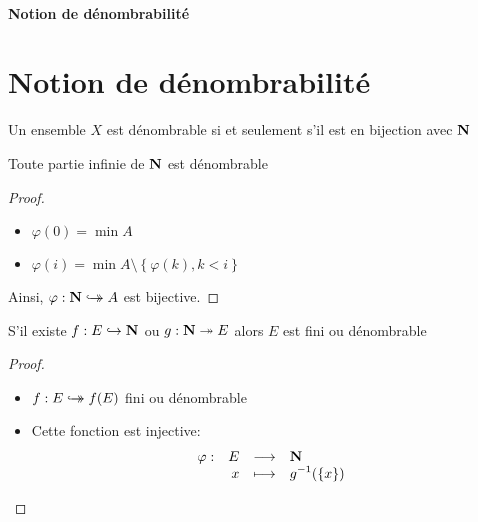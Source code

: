 \ifsolo
    ~

    \vspace{1cm}

    \begin{center}
        \textbf{\LARGE Notion de dénombrabilité} \\[1em]
    \end{center}
    \tableofcontents
\else
    \setcounter{chapter}{-1}
    \chapter{Notion de dénombrabilité}

    \minitoc
\fi
\thispagestyle{empty}

\begin{dfn}
    Un ensemble $X$ est dénombrable\footnotemark{}  si et seulement s'il est en bijection avec $\mathbf N$
\end{dfn}


\begin{prop}
Toute partie infinie de $\mathbf N$ est dénombrable
\end{prop}

\begin{proof}
\begin{itemize}
    \item $\varphi(0)=\min A$
    \item  $\varphi(i)=\min A\setminus \left\{ \varphi(k), k<i \right\} $
\end{itemize}
Ainsi, $\varphi: \mathbf N \hookrightarrow\mathrel{\mspace{-15mu}}\rightarrow A$ est bijective.
\end{proof}

\begin{prop}
S'il existe $f: E \hookrightarrow \mathbf N$ ou $g: \mathbf N \twoheadrightarrow E$ alors $E$ est fini ou dénombrable
\end{prop}

\begin{proof}
\begin{itemize}
    \item $f:E \hookrightarrow\mathrel{\mspace{-15mu}}\rightarrow f(E)$ fini ou dénombrable
    \item  Cette fonction est injective: \[
    \begin{array}{rrcl}
        \varphi:& E & \longrightarrow & \mathbf N \\
                & x & \longmapsto & \displaystyle g^{-1}(\left\{  x \right\} )
    \end{array}
    \] 
\end{itemize}
\end{proof}


